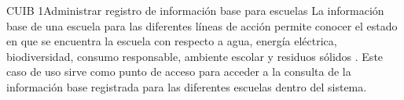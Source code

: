 
\begin{UseCase}{CUIB 1}{Administrar registro de información base para escuelas}
    {
	La información base de una escuela para las diferentes líneas de acción permite conocer el estado en que se encuentra la escuela con respecto a agua, energía eléctrica, biodiversidad, consumo responsable, ambiente escolar y residuos sólidos . Este caso de uso sirve como punto de acceso para acceder a la consulta de la información base registrada para las diferentes escuelas dentro del sistema.
    }
    

    



\end{UseCase}
